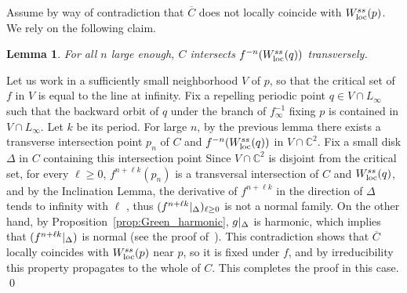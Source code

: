 \documentclass[11 pt, oneside, a4paper]{amsart}
\newcommand{\C}{\mathbb{C}}
\newcommand{\loc}{\mathrm{loc}}
\newcommand{\rest}[1]{ \arrowvert_{#1}}
\newcommand{\inv}{^{-1}}
\newtheorem{lem}[thm]{Lemma}
\theoremstyle{definition}
\theoremstyle{definition}
\begin{document}
Assume by way of contradiction that  
$\overline C$ does not locally coincide with $W^{\rm ss}_{\loc}(p)$. We rely on the following claim.
 \begin{lem}\label{lem:trans}
 {For all $n$ large enough,  $C$ intersects $f^{-n} (W^{\rm ss}_\loc(q))$ transversely.}
 \end{lem}
 {Let us work in a sufficiently small neighborhood $V$ of $p$,
 so that the critical set of $f$ in $V$  is equal to the line at infinity. Fix a repelling periodic point 
 $q\in V\cap L_\infty$  such that the backward orbit of $q$ under the branch of $f\inv_\infty$ fixing $p$ is contained in $V\cap L_\infty$. Let $k$ be its period. 
 For large $n$, by the previous lemma there exists  a transverse intersection point 
 $p_n$ of $C$ and $f^{-n} (W^{\rm ss}_\loc(q))$ in $V\cap \C^2$. Fix a small disk 
 $\Delta$ in $C$ containing this intersection point  
 Since $V\cap \C^2$ is disjoint from the critical set, 
  for every $\ell\ge 0$, $f^{n+\ell k}(p_n)$ is a transversal intersection of $C$ and $W^{\rm ss}_\loc(q)$, and by the Inclination Lemma,  the derivative of 
$f^{n+ \ell k}$ in the direction of $\Delta$ tends to infinity with $\ell$ , thus 
 $(f^{n+\ell k}\rest{\Delta})_{\ell\geq 0}$ is not a normal family. On the other hand, 
 by Proposition~\ref{prop:Green_harmonic}, $g\rest{\Delta}$ is harmonic, which 
 implies that $(f^{n+\ell k}\rest{\Delta})$ is  normal  (see the proof of~\cite[Prop. 5.10]{fornaess-sibony:cplxdynhigherdim2}). 
 This contradiction shows that 
 $\overline C$   locally coincides with   $W^{\rm ss}_{\loc}(p)$ near $p$,  so it is fixed under $f$, and by irreducibility this property propagates to the whole of $C$. This completes the proof in this case.   \qed
}
\end{document}
